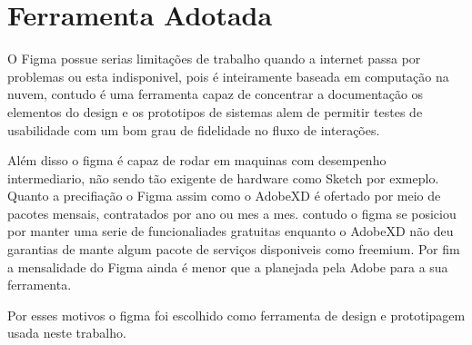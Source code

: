 \section{Ferramenta Adotada} \label{ferramenta_adotada}

O Figma possue serias limitações de trabalho quando a internet passa por problemas ou esta indisponivel, pois é inteiramente baseada em computação na nuvem, contudo é uma ferramenta capaz de concentrar a documentação os elementos do design e os prototipos de sistemas alem de permitir testes de usabilidade com um bom grau de fidelidade no fluxo de interações.

Além disso o figma é capaz de rodar em maquinas com desempenho intermediario, não sendo tão exigente de hardware como Sketch por exmeplo. Quanto a precifiação o Figma assim como o AdobeXD é ofertado por meio de pacotes mensais, contratados por ano ou mes a mes. contudo o figma se posiciou por manter uma serie de funcionaliades gratuitas enquanto o AdobeXD não deu garantias de mante algum pacote de serviços disponiveis como freemium. Por fim a mensalidade do Figma ainda é menor que a planejada pela Adobe para a sua ferramenta.

Por esses motivos o figma foi escolhido como ferramenta de design e prototipagem usada neste trabalho.